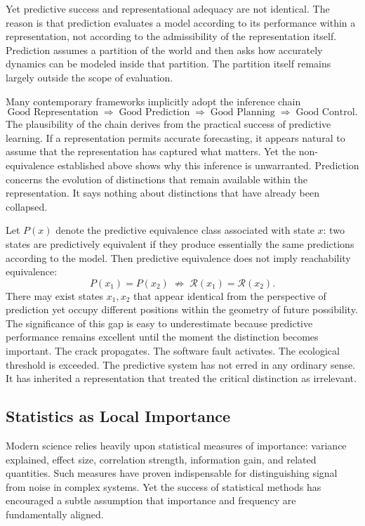 \documentclass[12pt,a4paper]{article}
\theoremstyle{plain}
\theoremstyle{definition}
\theoremstyle{remark}
\begin{document}
Yet predictive success and representational adequacy are not identical. The
reason is that prediction evaluates a model according to its performance
within a representation, not according to the admissibility of the
representation itself. Prediction assumes a partition of the world and then
asks how accurately dynamics can be modeled inside that partition. The
partition itself remains largely outside the scope of evaluation.

Many contemporary frameworks implicitly adopt the inference chain
\[
  \text{Good Representation}
  \;\Rightarrow\;
  \text{Good Prediction}
  \;\Rightarrow\;
  \text{Good Planning}
  \;\Rightarrow\;
  \text{Good Control}.
\]
The plausibility of the chain derives from the practical success of
predictive learning. If a representation permits accurate forecasting, it
appears natural to assume that the representation has captured what matters.
Yet the non-equivalence established above shows why this inference is
unwarranted. Prediction concerns the evolution of distinctions that remain
available within the representation. It says nothing about distinctions that
have already been collapsed.

Let $P(x)$ denote the predictive equivalence class associated with state
$x$: two states are predictively equivalent if they produce essentially the
same predictions according to the model. Then predictive equivalence does not
imply reachability equivalence:
\[
  P(x_1) = P(x_2)
  \;\not\Rightarrow\;
  \mathcal{R}(x_1) = \mathcal{R}(x_2).
\]
There may exist states $x_1, x_2$ that appear identical from the perspective
of prediction yet occupy different positions within the geometry of future
possibility. The significance of this gap is easy to underestimate because
predictive performance remains excellent until the moment the distinction
becomes important. The crack propagates. The software fault activates. The
ecological threshold is exceeded. The predictive system has not erred in any
ordinary sense. It has inherited a representation that treated the critical
distinction as irrelevant.

\subsection{Statistics as Local Importance}

Modern science relies heavily upon statistical measures of importance:
variance explained, effect size, correlation strength, information gain, and
related quantities. Such measures have proven indispensable for distinguishing
signal from noise in complex systems. Yet the success of statistical methods
has encouraged a subtle assumption that importance and frequency are
fundamentally aligned.
\end{document}
